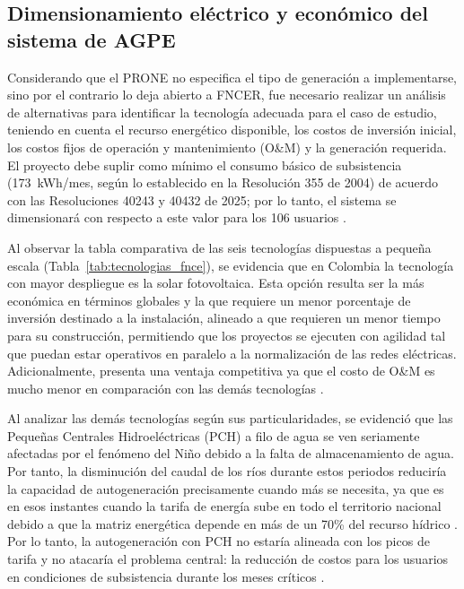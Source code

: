\subsection{Dimensionamiento eléctrico y económico del sistema de AGPE}
\label{subsec:dimensionamiento_agpe}

Considerando que el PRONE no especifica el tipo de generación a implementarse, sino por el contrario lo deja abierto a FNCER, fue necesario realizar un análisis de alternativas para identificar la tecnología adecuada para el caso de estudio, teniendo en cuenta el recurso energético disponible, los costos de inversión inicial, los costos fijos de operación y mantenimiento (O\&M) y la generación requerida. El proyecto debe suplir como mínimo el consumo básico de subsistencia (173~kWh/mes, según lo establecido en la Resolución 355 de 2004) de acuerdo con las Resoluciones 40243 y 40432 de 2025; por lo tanto, el sistema se dimensionará con respecto a este valor para los 106 usuarios \parencite{ResolucionCREG355_2004, ResolucionMME40243_2025, ResolucionMME40432_2025}.

Al observar la tabla comparativa de las seis tecnologías dispuestas a pequeña escala (Tabla~\ref{tab:tecnologias_fnce}), se evidencia que en Colombia la tecnología con mayor despliegue es la solar fotovoltaica. Esta opción resulta ser la más económica en términos globales y la que requiere un menor porcentaje de inversión destinado a la instalación, alineado a que requieren un menor tiempo para su construcción, permitiendo que los proyectos se ejecuten con agilidad tal que puedan estar operativos en paralelo a la normalización de las redes eléctricas. Adicionalmente, presenta una ventaja competitiva ya que el costo de O\&M es mucho menor en comparación con las demás tecnologías \parencite{UPMECatalogoTecnologico2024}.

Al analizar las demás tecnologías según sus particularidades, se evidenció que las Pequeñas Centrales Hidroeléctricas (PCH) a filo de agua se ven seriamente afectadas por el fenómeno del Niño debido a la falta de almacenamiento de agua. Por tanto, la disminución del caudal de los ríos durante estos periodos reduciría la capacidad de autogeneración precisamente cuando más se necesita, ya que es en esos instantes cuando la tarifa de energía sube en todo el territorio nacional debido a que la matriz energética depende en más de un 70\% del recurso hídrico \parencite{XMGeneracionReal2025}. Por lo tanto, la autogeneración con PCH no estaría alineada con los picos de tarifa y no atacaría el problema central: la reducción de costos para los usuarios en condiciones de subsistencia durante los meses críticos \parencite{UPMECatalogoTecnologico2024}.

